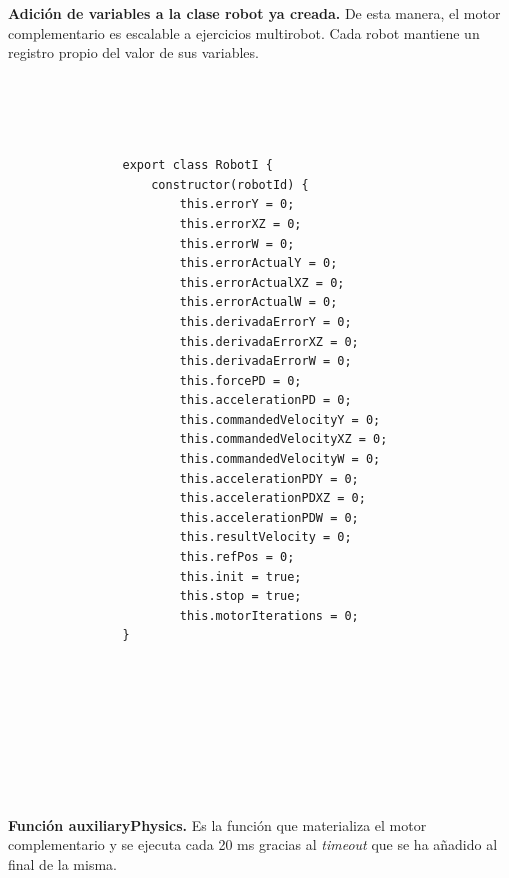 \textbf{Adición de variables a la clase robot ya creada.} De esta manera, el motor complementario es escalable a ejercicios multirobot. Cada robot mantiene un registro propio del valor de sus variables.
\small {
\begin{verbatim}




                export class RobotI {
                    constructor(robotId) {
                        this.errorY = 0;
                        this.errorXZ = 0;
                        this.errorW = 0;
                        this.errorActualY = 0;
                        this.errorActualXZ = 0;
                        this.errorActualW = 0;
                        this.derivadaErrorY = 0;
                        this.derivadaErrorXZ = 0;
                        this.derivadaErrorW = 0;
                        this.forcePD = 0;
                        this.accelerationPD = 0;
                        this.commandedVelocityY = 0;
                        this.commandedVelocityXZ = 0;
                        this.commandedVelocityW = 0;
                        this.accelerationPDY = 0;
                        this.accelerationPDXZ = 0;
                        this.accelerationPDW = 0;
                        this.resultVelocity = 0;
                        this.refPos = 0;
                        this.init = true;
                        this.stop = true;
                        this.motorIterations = 0;
                }
                
                
                
                
                
                
                
                
\end{verbatim}
}

\normalsize
\textbf{Función auxiliaryPhysics.} Es la función que materializa el motor complementario y se ejecuta cada 20 ms gracias al \textit{timeout} que se ha añadido al final de la misma.

